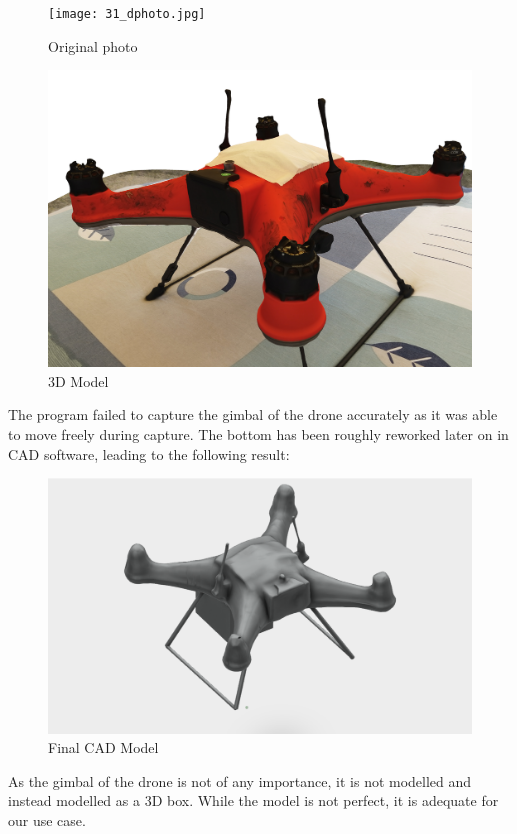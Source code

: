 \begin{figure}[h]
  \centering
  \begin{minipage}[b]{0.4\textwidth}
    \texttt{[image: 31\_dphoto.jpg]}
    \caption{Original photo \cite{dronemodel}}
  \end{minipage}
  \hfill
  \begin{minipage}[b]{0.5\textwidth}
    \includegraphics[width=\textwidth]{32_dmodel.png}
    \caption{3D Model \cite{dronemodel}}
  \end{minipage}
\end{figure}

The program failed to capture the gimbal of the drone accurately as it was able to move freely during capture. The bottom has been roughly reworked later on in CAD software, leading to the following result:

\begin{figure}[h]
\centering
\includegraphics[scale=0.1]{33_dcadmodel.png}
\caption{Final CAD Model \cite{dronemodel}}
\end{figure}

As the gimbal of the drone is not of any importance, it is not modelled and instead modelled as a 3D box. While the model is not perfect, it is adequate for our use case.

